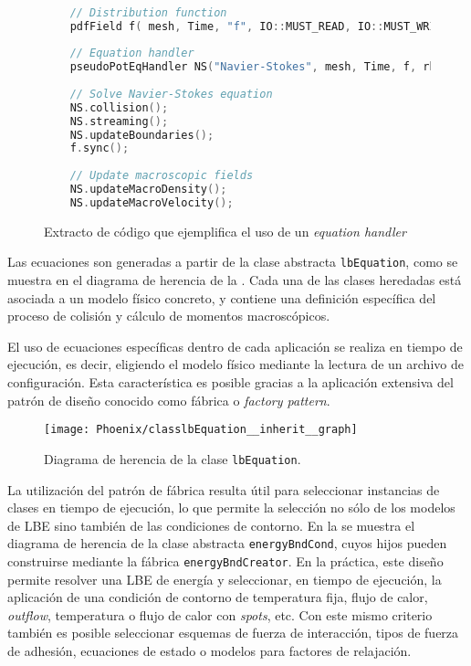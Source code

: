\begin{figure}[ht]
	\centering
	\begin{lstlisting}[language=C++]

	// Distribution function		
	pdfField f( mesh, Time, "f", IO::MUST_READ, IO::MUST_WRITE );	
	
	// Equation handler	
	pseudoPotEqHandler NS("Navier-Stokes", mesh, Time, f, rho, U, T);
	
	// Solve Navier-Stokes equation
	NS.collision();
	NS.streaming();
	NS.updateBoundaries();
	f.sync();
	
	// Update macroscopic fields
	NS.updateMacroDensity();
	NS.updateMacroVelocity();
	\end{lstlisting}
	\caption{Extracto de c\'odigo que ejemplifica el uso de un \emph{equation handler}}
	\label{fig:eq_handler}
\end{figure}

Las ecuaciones son generadas a partir de la clase abstracta \texttt{lbEquation}, como se muestra en el diagrama de herencia de la . Cada una de las clases heredadas est\'a asociada a un modelo f\'isico concreto, y contiene una definici\'on espec\'ifica del proceso de colisi\'on y c\'alculo de momentos macrosc\'opicos.

El uso de ecuaciones espec\'ificas dentro de cada aplicaci\'on se realiza en tiempo de ejecuci\'on, es decir, eligiendo el modelo f\'isico mediante la lectura de un archivo de configuraci\'on. Esta caracter\'istica es posible gracias a la aplicaci\'on extensiva del patr\'on de dise\~no conocido como f\'abrica o \emph{factory pattern}.

\begin{figure}[ht]
	\centering
	\texttt{[image: Phoenix/classlbEquation\_\_inherit\_\_graph]}
	\caption{Diagrama de herencia de la clase \texttt{lbEquation}.}
	\label{fig:lbeq_her}
\end{figure}

La utilizaci\'on del patr\'on de f\'abrica resulta \'util para seleccionar instancias de clases en tiempo de ejecuci\'on, lo que permite la selecci\'on no s\'olo de los modelos de LBE sino tambi\'en de las condiciones de contorno. En la  se muestra el diagrama de herencia de la clase abstracta \texttt{energyBndCond}, cuyos hijos pueden construirse mediante la f\'abrica \texttt{energyBndCreator}. En la pr\'actica, este dise\~no permite resolver una LBE de energ\'ia y seleccionar, en tiempo de ejecuci\'on, la aplicaci\'on de una condici\'on de contorno de temperatura fija, flujo de calor, \emph{outflow}, temperatura o flujo de calor con \emph{spots}, etc. Con este mismo criterio tambi\'en es posible seleccionar esquemas de fuerza de interacci\'on, tipos de fuerza de adhesi\'on, ecuaciones de estado o modelos para factores de relajaci\'on.

